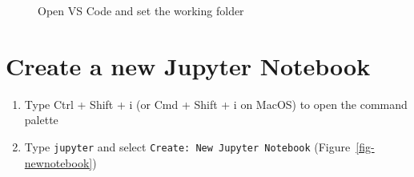 \documentclass[
  letterpaper,
  DIV=11,
  numbers=noendperiod]{scrreprt}
\providecommand{\tightlist}{%
  \setlength{\itemsep}{0pt}\setlength{\parskip}{0pt}}\usepackage{longtable,booktabs,array}
\begin{document}
\begin{figure}


\caption{\label{fig-open}Open VS Code and set the working folder}

\end{figure}%

\section*{Create a new Jupyter
Notebook}\label{create-a-new-jupyter-notebook}


\begin{enumerate}
\def\labelenumi{\arabic{enumi}.}
\tightlist
\item
  Type Ctrl + Shift + i (or Cmd + Shift + i on MacOS) to open the
  command palette
\item
  Type \texttt{jupyter} and select
  \texttt{Create:\ New\ Jupyter\ Notebook}
  (Figure~\ref{fig-newnotebook})
\end{enumerate}
\end{document}
